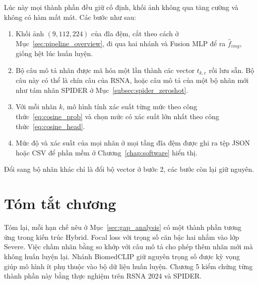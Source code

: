 Lúc này mọi thành phần đều giữ cố định, khối ảnh không qua tăng cường và không có hàm mất mát. Các bước như sau:
\begin{enumerate}
    \item Khối ảnh $(9, 112, 224)$ của đĩa đệm, cắt theo cách ở Mục~\ref{sec:pipeline_overview}, đi qua hai nhánh và Fusion MLP để ra $\hat{f}_{img}$, giống hệt lúc huấn luyện.
    \item Bộ câu mô tả nhãn được mã hóa một lần thành các vector $t_{k,c}$ rồi lưu sẵn. Bộ câu này có thể là chín câu của RSNA, hoặc câu mô tả của một bộ nhãn mới như tám nhãn SPIDER ở Mục~\ref{subsec:spider_zeroshot}.
    \item Với mỗi nhãn $k$, mô hình tính xác suất từng mức theo công thức~\eqref{eq:cosine_prob} và chọn mức có xác suất lớn nhất theo công thức~\eqref{eq:cosine_head}.
    \item Mức độ và xác suất của mọi nhãn ở mọi tầng đĩa đệm được ghi ra tệp JSON hoặc CSV để phần mềm ở Chương~\ref{chap:software} hiển thị.
\end{enumerate}
Đổi sang bộ nhãn khác chỉ là đổi bộ vector ở bước 2, các bước còn lại giữ nguyên.

\section{Tóm tắt chương}

Tóm lại, mỗi hạn chế nêu ở Mục~\ref{sec:gap_analysis} có một thành phần tương ứng trong kiến trúc Hybrid. Focal loss với trọng số căn bậc hai nhắm vào lớp Severe. Việc chấm nhãn bằng so khớp với câu mô tả cho phép thêm nhãn mới mà không huấn luyện lại. Nhánh BiomedCLIP giữ nguyên trọng số được kỳ vọng giúp mô hình ít phụ thuộc vào bộ dữ liệu huấn luyện. Chương 5 kiểm chứng từng thành phần này bằng thực nghiệm trên RSNA 2024 và SPIDER.
